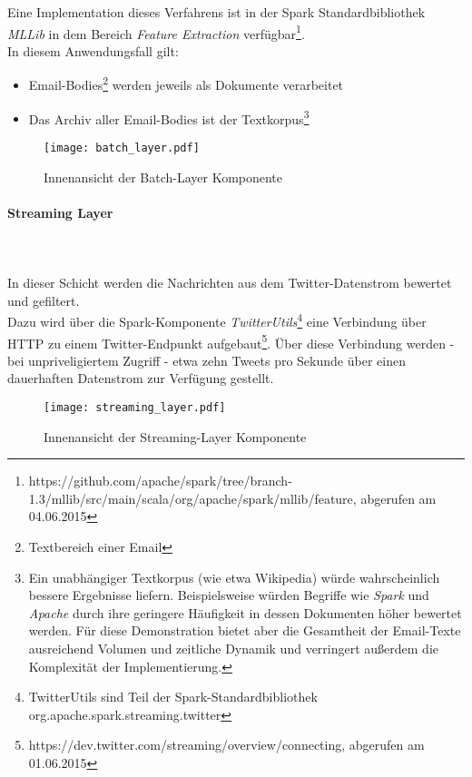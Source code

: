 Eine Implementation dieses Verfahrens ist in der Spark Standardbibliothek \textit{MLLib} in dem Bereich \textit{Feature Extraction} verfügbar\footnote{https://github.com/apache/spark/tree/branch-1.3/mllib/src/main/scala/org/apache/spark/mllib/feature, abgerufen am 04.06.2015}.\\

In diesem Anwendungsfall gilt:
\begin{itemize}
\item Email-Bodies\footnote{Textbereich einer Email} werden jeweils als Dokumente verarbeitet
\item Das Archiv aller Email-Bodies ist der Textkorpus\footnote{Ein unabhängiger Textkorpus (wie etwa Wikipedia) würde wahrscheinlich bessere Ergebnisse liefern. Beispielsweise würden Begriffe wie \textit{Spark} und \textit{Apache} durch ihre geringere Häufigkeit in dessen Dokumenten höher bewertet werden. Für diese Demonstration bietet aber die Gesamtheit der Email-Texte ausreichend Volumen und zeitliche Dynamik und verringert außerdem die Komplexität der Implementierung.}
\end{itemize}

\begin{figure}[ht!]
	\centering
  \texttt{[image: batch\_layer.pdf]}
	\caption{Innenansicht der Batch-Layer Komponente}
	\label{figure:demo_app_batchlayer}
\end{figure}



\paragraph{Streaming Layer}\\
\\

In dieser Schicht werden die Nachrichten aus dem Twitter-Datenstrom bewertet und gefiltert.\\

Dazu wird über die Spark-Komponente \textit{TwitterUtils}\footnote{TwitterUtils sind Teil der Spark-Standardbibliothek org.apache.spark.streaming.twitter} eine Verbindung über HTTP zu einem Twitter-Endpunkt aufgebaut\footnote{https://dev.twitter.com/streaming/overview/connecting, abgerufen am 01.06.2015}. Über diese Verbindung werden - bei unpriveligiertem Zugriff - etwa zehn Tweets pro Sekunde über einen dauerhaften Datenstrom zur Verfügung gestellt.\\

\begin{figure}[ht!]
	\centering
  \texttt{[image: streaming\_layer.pdf]}
	\caption{Innenansicht der Streaming-Layer Komponente}
	\label{figure:demo_app_streaminglayer}
\end{figure}

